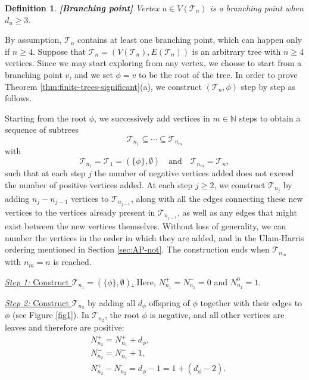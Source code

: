 \documentclass[11pt]{article}
\numberwithin{equation}{section}
\theoremstyle{plain}
\newtheorem{definition}[theorem]{Definition}
\newcommand{\N}{\mathbb N}
\newcommand{\Tt}{\mathcal{T}}
\begin{document}
\begin{definition}{\bf [Branching point]}
\label{def:branching-point}
{\rm Vertex $u\in V(\Tt_n)$ is a branching point when $d_u \geq 3$.} 
\end{definition}

By assumption, $\Tt_n$ contains at least one branching point, which can happen only if $n\ge 4$. Suppose that $\mathcal{T}_n = (V(\mathcal{T}_n),E(\mathcal{T}_n))$ is an arbitrary tree with $n \geq 4$ vertices.  Since we may start exploring from any vertex, we choose to start from a branching point $v$, and we set $\phi =v$ to be the root of the tree. In order to prove Theorem \ref{thm:finite-trees-significant}(a), we construct $(\mathcal{T}_n,\phi)$ step by step as follows. 

Starting from the root $\phi$, we successively add vertices in $m\in\N$ steps to obtain a sequence of subtrees 
\[
\mathcal{T}_{n_1} \subseteq \cdots \subseteq \mathcal{T}_{n_m}
\]
with
\[
\mathcal{T}_{n_1} = \mathcal{T}_1 = (\{\phi\},\emptyset)\quad \text{and} \quad \mathcal{T}_{n_m} = \mathcal{T}_{n},
\]
such that at each step $j$ the number of negative vertices added does not exceed the number of positive vertices added. At each step $j \geq 2$, we construct $\Tt_{n_j}$ by adding $n_j - n_{j-1}$ vertices to $\Tt_{n_{j-1}}$, along with all the edges connecting these new vertices to the vertices already present in $\Tt_{n_{j-1}}$, as well as any edges that might exist between the new vertices themselves. Without loss of generality, we can number the vertices in the order in which they are added, and in the Ulam-Harris ordering mentioned in Section \ref{sec:AP-not}. The construction ends when $\mathcal{T}_{n_m}$ with $n_m=n$ is reached.

\medskip\noindent
\underline{\textit{Step 1:} Construct $\mathcal{T}_{n_1} = (\{\phi\},\emptyset)$.} Here, $N_{n_1}^+ = N_{n_1}^- = 0$ and $N_{n_1}^0 = 1$.

\medskip\noindent
\underline{\textit{Step 2:} Construct $\mathcal{T}_{n_2}$} by adding all $d_\phi$ offspring of $\phi$ together with their edges to $\phi$ (see Figure \ref{fig1}). In $\Tt_{n_2}$, the root $\phi$ is negative, and all other vertices are leaves and therefore are positive: 
\begin{align*}
&N_{n_2}^+=N_{n_1}^+ +d_\phi,\\
&N_{n_2}^-=N_{n_1}^-+1,\\
&N_{n_2}^+-N_{n_2}^-=d_\phi-1=1+(d_\phi-2).
\end{align*}
\end{document}
